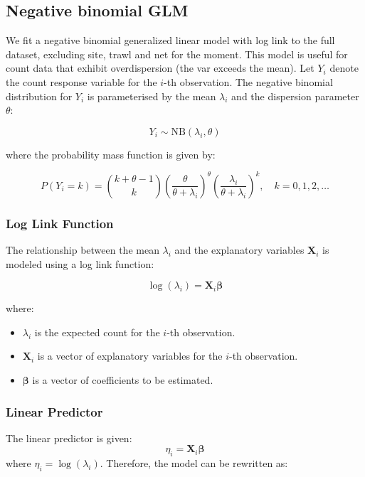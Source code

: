 \documentclass[
]{article}
\begin{document}
\subsection{Negative binomial GLM}\label{negative-binomial-glm}

We fit a negative binomial generalized linear model with log link to the
full dataset, excluding site, trawl and net for the moment. This model
is useful for count data that exhibit overdispersion (the var exceeds
the mean). Let \(Y_i\) denote the count response variable for the
\(i\)-th observation. The negative binomial distribution for \(Y_i\) is
parameterised by the mean \(\lambda_i\) and the dispersion parameter
\(\theta\):

\[
Y_i \sim \text{NB}(\lambda_i, \theta)
\]

where the probability mass function is given by:

\[
P(Y_i = k) = \binom{k + \theta - 1}{k} \left( \frac{\theta}{\theta + \lambda_i} \right)^\theta \left( \frac{\lambda_i}{\theta + \lambda_i} \right)^k, \quad k = 0, 1, 2, \ldots
\]

\subsubsection{Log Link Function}\label{log-link-function}

The relationship between the mean \(\lambda_i\) and the explanatory
variables \(\mathbf{X}_i\) is modeled using a log link function:

\[
\log(\lambda_i) = \mathbf{X}_i \boldsymbol{\beta}
\]

where:

\begin{itemize}
    \item \( \lambda_i \) is the expected count for the \( i \)-th observation.
    \item \( \mathbf{X}_i \) is a vector of explanatory variables for the \( i \)-th observation.
    \item \( \boldsymbol{\beta} \) is a vector of coefficients to be estimated.
\end{itemize}

\subsubsection{Linear Predictor}\label{linear-predictor}

The linear predictor is given: \[
\eta_i = \mathbf{X}_i \boldsymbol{\beta}
\] where \(\eta_i = \log(\lambda_i)\). Therefore, the model can be
rewritten as:
\end{document}
